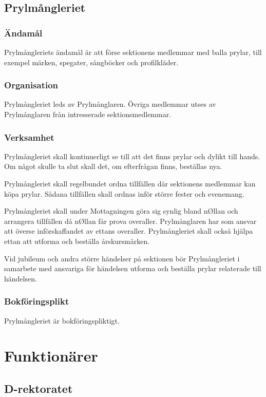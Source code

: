 \documentclass{dgovdoc}
\begin{document}
\subsection{Prylmångleriet}

\subsubsection{Ändamål}

Prylmångleriets ändamål är att förse sektionens medlemmar med balla prylar, till exempel märken, spegater, sångböcker och profilkläder.

\subsubsection{Organisation}
Prylmångleriet leds av Prylmånglaren. Övriga medlemmar utses av Prylmånglaren från intresserade sektionsmedlemmar.

\subsubsection{Verksamhet}
Prylmångleriet skall kontinuerligt se till att det finns prylar och dylikt till hands. Om något skulle ta slut skall det, om efterfrågan finns, beställas nya.

Prylmångleriet skall regelbundet ordna tillfällen där sektionens medlemmar kan köpa prylar. Sådana tillfällen skall ordnas inför större fester och evenemang.

Prylmångleriet skall under Mottagningen göra sig synlig bland nØllan och arrangera tillfällen då nØllan får prova overaller. Prylmånglaren har som ansvar att överse införskaffandet av ettans overaller. Prylmångleriet skall också hjälpa ettan att utforma och beställa årskursmärken.

Vid jubileum och andra större händelser på sektionen bör Prylmångleriet i samarbete med ansvariga för händelsen utforma och beställa prylar relaterade till händelsen.

\subsubsection{Bokföringsplikt}
Prylmångleriet är bokföringspliktigt.

\section{Funktionärer}

\subsection{D-rektoratet}
\end{document}
